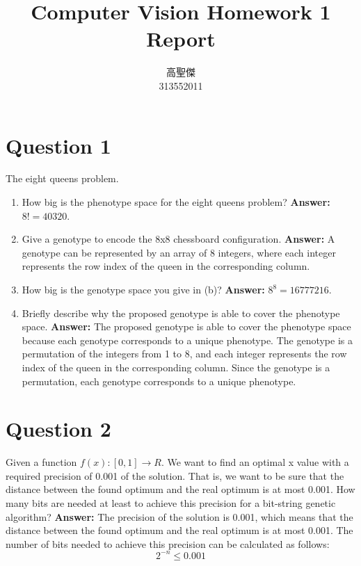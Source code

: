 \documentclass[12pt,letterpaper]{article}
\newcommand{\xAns}{\vskip 2mm\textbf{Answer:} }
\begin{document}
\begin{CJK}{UTF8}{bkai}
    \title{Computer Vision Homework 1 Report}

    \author{
        高聖傑\\
        313552011\\
    }

    \maketitle
\end{CJK}

\section{Question 1}
The eight queens problem.
\begin{enumerate}[label=(\alph*)]
    \item How big is the phenotype space for the eight queens problem? \xAns $8! = 40320$.
    \item Give a genotype to encode the 8x8 chessboard configuration. \xAns A genotype can be represented by an array of 8 integers, where each integer represents the row index of the queen in the corresponding column.
    \item How big is the genotype space you give in (b)? \xAns $8^8 = 16777216$.
    \item Briefly describe why the proposed genotype is able to cover the phenotype space. \xAns The proposed genotype is able to cover the phenotype space because each genotype corresponds to a unique phenotype. The genotype is a permutation of the integers from 1 to 8, and each integer represents the row index of the queen in the corresponding column. Since the genotype is a permutation, each genotype corresponds to a unique phenotype.
\end{enumerate}
\section{Question 2}
Given a function $f(x) : [0,1] \rightarrow R$. We want to find an optimal x
value with a required precision of 0.001 of the solution. That is, we
want to be sure that the distance between the found optimum and the
real optimum is at most 0.001. How many bits are needed at least to
achieve this precision for a bit-string genetic algorithm?
\xAns The precision of the solution is 0.001, which means that the distance between the found optimum and the real optimum is at most 0.001. The number of bits needed to achieve this precision can be calculated as follows:
\begin{equation}
    2^{-n} \leq 0.001
\end{equation}
\end{document}
